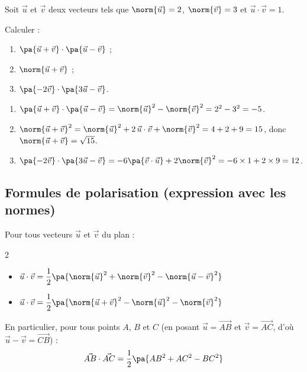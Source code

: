 \begin{methode}
	Soit $\vec{u}$ et $\vec{v}$ deux vecteurs tels que $\norm{\vec{u}} = 2$, $\norm{\vec{v}} = 3$ et $\vec{u} \cdot \vec{v} = 1$.

	Calculer :
	\begin{enumerate}
		\item $\pa{\vec{u} + \vec{v}} \cdot \pa{\vec{u} - \vec{v}}$ ;
		\item $\norm{\vec{u} + \vec{v}}$ ;
		\item $\pa{-2\vec{v}} \cdot \pa{3\vec{u} - \vec{v}}$.
	\end{enumerate}

	\begin{correction}
		\nline
		\begin{enumerate}
			\item $\pa{\vec{u} + \vec{v}} \cdot \pa{\vec{u} - \vec{v}} = \norm{\vec{u}}^2 - \norm{\vec{v}}^2 = 2^2 - 3^2 = -5$.
			\item $\norm{\vec{u} + \vec{v}}^2 = \norm{\vec{u}}^2 + 2\,\vec{u} \cdot \vec{v} + \norm{\vec{v}}^2 = 4 + 2 + 9 = 15$, donc $\norm{\vec{u} + \vec{v}} = \sqrt{15}$.
			\item $\pa{-2\vec{v}} \cdot \pa{3\vec{u} - \vec{v}} = -6\pa{\vec{v} \cdot \vec{u}} + 2\norm{\vec{v}}^2 = -6 \times 1 + 2 \times 9 = 12$.
		\end{enumerate}
	\end{correction}
\end{methode}

\subsection{Formules de polarisation (expression avec les normes)}

\begin{propriete}
	Pour tous vecteurs $\vec{u}$ et $\vec{v}$ du plan :
	\vspace{-3mm}
	\begin{multicols}{2}
		\begin{itemize}
			\item $\vec{u} \cdot \vec{v} = \dfrac{1}{2}\pa{\norm{\vec{u}}^2 + \norm{\vec{v}}^2 - \norm{\vec{u} - \vec{v}}^2}$
			\item $\vec{u} \cdot \vec{v} = \dfrac{1}{2}\pa{\norm{\vec{u} + \vec{v}}^2 - \norm{\vec{u}}^2 - \norm{\vec{v}}^2}$
		\end{itemize}
	\end{multicols}

	En particulier, pour tous points $A$, $B$ et $C$ (en posant $\vec{u} = \vec{AB}$ et $\vec{v} = \vec{AC}$, d'où $\vec{u} - \vec{v} = \vec{CB}$) :
	\[
		\vec{AB} \cdot \vec{AC} = \dfrac{1}{2}\pa{AB^2 + AC^2 - BC^2}
	\]
\end{propriete}

